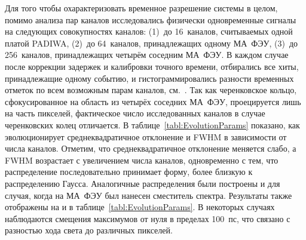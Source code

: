




Для того чтобы охарактеризовать временное разрешение системы в целом, помимо анализа пар каналов исследовались физически одновременные сигналы на следующих совокупностях каналов: (1)~до 16~каналов, считываемых одной платой PADIWA, (2)~до 64~каналов, принадлежащих одному МА~ФЭУ, (3)~до 256~каналов, принадлежащих четырём соседним МА~ФЭУ. В каждом случае после коррекции задержек и калибровки точного времени, отбирались все хиты, принадлежащие одному событию, и гистограммировались разности временных отметок по всем возможным парам каналов, см.~. Так как черенковское кольцо, сфокусированное на область из четырёх соседних МА~ФЭУ, проецируется лишь на часть пикселей, фактическое число исследованных каналов в случае черенковских колец отличается. В таблице~\ref{tabl:EvolutionParams} показано, как эволюционирует среднеквадратичное отклонение и FWHM в зависимости от числа каналов. Отметим, что среднеквадратичное отклонение меняется слабо, а FWHM возрастает с увеличением числа каналов, одновременно с тем, что распределение последовательно принимает форму, более близкую к распределению Гаусса. Аналогичные распределения были построены и для случая, когда на МА~ФЭУ был нанесен сместитель спектра. Результаты также отображены на  и в таблице~\ref{tabl:EvolutionParams}. В некоторых случаях наблюдаются смещения максимумов от нуля в пределах 100~пс, что связано с разностью хода света до различных пикселей.


